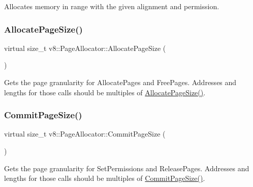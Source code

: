 Allocates memory in range with the given alignment and permission. \mbox{\label{classv8_1_1PageAllocator_a92c2f6dbb3afa6c47dafd4c12ab4641f}} 
\subsubsection{\texorpdfstring{Allocate\+Page\+Size()}{AllocatePageSize()}}
{\footnotesize\ttfamily virtual size\+\_\+t v8\+::\+Page\+Allocator\+::\+Allocate\+Page\+Size (\begin{DoxyParamCaption}{ }\end{DoxyParamCaption})\hspace{0.3cm}{\ttfamily [pure virtual]}}

Gets the page granularity for Allocate\+Pages and Free\+Pages. Addresses and lengths for those calls should be multiples of \mbox{\hyperlink{classv8_1_1PageAllocator_a92c2f6dbb3afa6c47dafd4c12ab4641f}{Allocate\+Page\+Size()}}. \mbox{\label{classv8_1_1PageAllocator_ad817d87004151e3824997415f2dc57e9}} 
\subsubsection{\texorpdfstring{Commit\+Page\+Size()}{CommitPageSize()}}
{\footnotesize\ttfamily virtual size\+\_\+t v8\+::\+Page\+Allocator\+::\+Commit\+Page\+Size (\begin{DoxyParamCaption}{ }\end{DoxyParamCaption})\hspace{0.3cm}{\ttfamily [pure virtual]}}

Gets the page granularity for Set\+Permissions and Release\+Pages. Addresses and lengths for those calls should be multiples of \mbox{\hyperlink{classv8_1_1PageAllocator_ad817d87004151e3824997415f2dc57e9}{Commit\+Page\+Size()}}. \mbox{\label{classv8_1_1PageAllocator_ad0de847c922e25f63d82494d997f441d}} 
